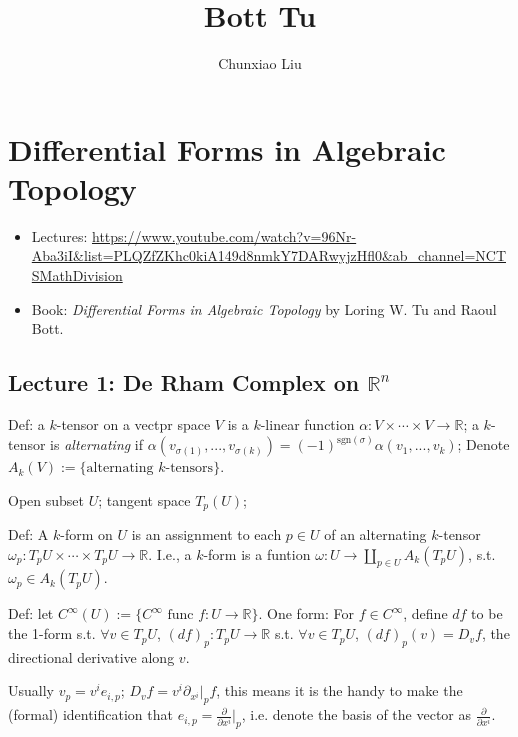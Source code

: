 \documentclass{article}
\title{Bott Tu}
\author{Chunxiao Liu}
\theoremstyle{mystyle}
\theoremstyle{remark}
\numberwithin{equation}{section}
\begin{document}
\maketitle




\tableofcontents

\section{Differential Forms in Algebraic Topology}

\begin{itemize}
\item Lectures: \url{https://www.youtube.com/watch?v=96Nr-Aba3iI&list=PLQZfZKhc0kiA149d8nmkY7DARwyjzHfl0&ab_channel=NCTSMathDivision}

\item Book: \emph{Differential Forms in Algebraic Topology} by Loring W. Tu and Raoul Bott.
\end{itemize}


\subsection{Lecture 1: De Rham Complex on $\mathbb{R}^n$}

Def: a $k$-tensor on a vectpr space $V$ is a $k$-linear function $\alpha \colon V\times\cdots \times V\rightarrow \mathbb{R}$; a $k$-tensor is \emph{alternating} if $\alpha(v_{\sigma(1)},...,v_{\sigma(k)}) = (-1)^{\mathrm{sgn}(\sigma)}
\alpha(v_1,...,v_k)$; Denote $A_k(V):= \{\text{alternating }k\text{-tensors}\}$. 

Open subset $U$; tangent space $T_p(U)$;

Def: A $k$-form on $U$ is an assignment to each $p\in U$ of an alternating $k$-tensor $\omega_p\colon T_pU\times \cdots \times T_pU\rightarrow \mathbb{R}$. I.e., a $k$-form is a funtion $\omega \colon U\rightarrow \amalg_{p\in U} A_k(T_pU)$, s.t. $\omega_p \in A_k(T_pU)$. 

Def: let $C^\infty(U) :=\{C^\infty \text{ func }f\colon U\rightarrow \mathbb{R}\}$. One form: For $f \in C^\infty$, define $df$ to be the 1-form s.t. $\forall v \in T_pU$, $(df)_p\colon T_pU\rightarrow \mathbb{R}$ s.t. $\forall v \in T_pU$, $(df)_p(v) = D_vf$, the directional derivative along $v$.  

Usually $v_p =  v^i e_{i,p}$; $D_vf =  v^i \partial_{x^i}|_p f$, this means it is the handy to make the (formal) identification that $e_{i,p} = \frac{\partial}{\partial x^i}|_p$, i.e. denote the basis of the vector as $\frac{\partial}{\partial x^i}$. 
\end{document}
